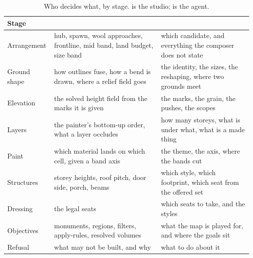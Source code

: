 \begin{table}[htbp]
\caption{Who decides what, by stage.  is the studio; 
is the agent.}
\label{tab:division}
\small
\begin{tabularx}{\textwidth}{L{2.5cm} Y Y}
\toprule
\textbf{Stage} & \textbf{} & \textbf{} \\
\midrule
Arrangement &
  hub, spawn, wool approaches, frontline, mid band, land budget, size band &
  which candidate, and everything the composer does not state \\
Ground shape &
  how outlines fuse, how a bend is drawn, where a relief field goes &
  the identity, the sizes, the reshaping, where two grounds meet \\
Elevation &
  the solved height field from the marks it is given &
  the marks, the grain, the pushes, the scopes \\
Layers &
  the painter's bottom-up order, what a layer occludes &
  how many storeys, what is under what, what is a made thing \\
Paint &
  which material lands on which cell, given a band axis &
  the theme, the axis, where the bands cut \\
Structures &
  storey heights, roof pitch, door side, porch, beams &
  which style, which footprint, which seat from the offered set \\
Dressing &
  the legal seats &
  which seats to take, and the styles \\
Objectives &
  monuments, regions, filters, apply-rules, resolved volumes &
  what the map is played for, and where the goals sit \\
Refusal &
  what may not be built, and why &
  what to do about it \\
\bottomrule
\end{tabularx}
\end{table}
